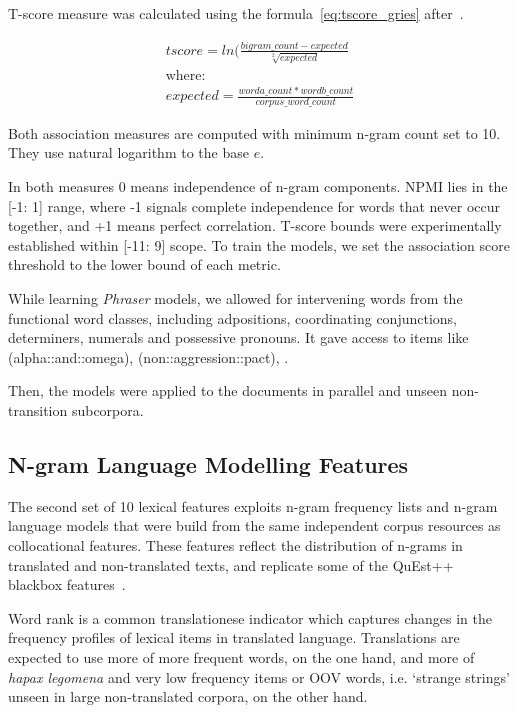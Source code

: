 T-score measure was calculated using the formula~\ref{eq:tscore_gries} after~\citet{Gries2010}. 

\begin{equation}\label{eq:tscore_gries}
\begin{split}
tscore = ln(\frac{bigram\_count - expected}{\sqrt[2]{expected}} \\
\text{where:}\\
expected = \frac{worda\_count * wordb\_count}{corpus\_word\_count}
\end{split}
\end{equation}

Both association measures are computed with minimum n-gram count set to 10. They use natural logarithm to the base $e$.
 
In both measures 0 means independence of n-gram components. NPMI lies in the [-1: 1] range, where -1 signals complete independence for words that never occur together, and +1 means perfect correlation. T-score bounds were experimentally established within [-11: 9] scope.
To train the models, we set the association score threshold to the lower bound of each metric.

While learning \textit{Phraser} models, we allowed for intervening words from the functional word classes, including adpositions, coordinating conjunctions, determiners, numerals and possessive pronouns. It gave access to items like  (alpha::and::omega),  (non::aggression::pact), .

Then, the models were applied to the documents in parallel and unseen non-transition subcorpora.

\subsection{\label{ssec:ngram}N-gram Language Modelling Features}

The second set of 10 lexical features exploits n-gram frequency lists and n-gram language models that were build from the same independent corpus resources as collocational features. These features reflect the distribution of n-grams in translated and non-translated texts, and replicate some of the QuEst++ blackbox features~\cite{Shah2013}. 

Word rank is a common translationese indicator which captures changes in the frequency profiles of lexical items in translated language. Translations are expected to use more of more frequent words, on the one hand, and more of \textit{hapax legomena} and very low frequency items or \gls{OOV} words, i.e. `strange strings' unseen in large non-translated corpora, on the other hand. 

